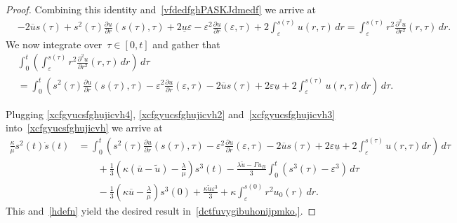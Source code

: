 \documentclass[12pt,a4paper,intlimits,sumlimits]{amsart}
\theoremstyle{definition}
\theoremstyle{plain}
\numberwithin{equation}{section}
\begin{document}
\begin{proof}
Combining this identity and~\eqref{vfdedfghPASKJdmedf} we arrive at
\begin{equation*}
\begin{split}
&-2\overline u s(\tau)+s^2(\tau) \frac{\partial u}{\partial r}(s(\tau),\tau)
+2\underline u\varepsilon -\varepsilon^2 \frac{\partial u}{\partial r}(\varepsilon,\tau)+ 2\int_\varepsilon^{s(\tau)}u(r,\tau)\,dr=\int_\varepsilon^{s(\tau)}r^2 \frac{\partial^2u}{\partial r^2}(r,\tau)\,dr.
\end{split}\end{equation*}
We now integrate over~$\tau\in[0,t]$ and gather that
\begin{equation}\label{xcfgyucsfghujicvh3}
\begin{aligned}&
\int_0^t\left(\int_\varepsilon^{s(\tau)}r^2\frac{\partial^2u}{\partial r^2}(r,\tau)\, dr\right)\,d\tau \\
&=\int_0^t\left(s^2(\tau)\frac{\partial u}{\partial r}(s(\tau),\tau)-\varepsilon^2\frac{\partial u}{\partial r}(\varepsilon,\tau)-2\overline{u} s(\tau)+2\varepsilon\underline{u}+2\int_\varepsilon^{s(\tau)}u(r,\tau)dr\right) \,d\tau.
\end{aligned}
\end{equation}

Plugging \eqref{xcfgyucsfghujicvh4},
\eqref{xcfgyucsfghujicvh2} and~\eqref{xcfgyucsfghujicvh3} into~\eqref{xcfgyucsfghujicvh} we arrive 
at
\begin{equation*}
\begin{aligned}
\frac{\kappa}{\mu}s^2(t)\dot s(t)&=\int_0^t\left(s^2(\tau)\frac{\partial u}{\partial r}(s(\tau),\tau)-\varepsilon^2\frac{\partial u}{\partial r}(\varepsilon,\tau)-2\overline{u}s(\tau)+2\varepsilon \underline{u} +2\int_\varepsilon^{s(\tau)}u(r,\tau)dr\right) \,d\tau \\
&\qquad +\frac{1}{3}\left(\kappa(\overline{u}-\widetilde u)-\frac{\lambda}{\mu}\right)s^3(t)-\frac{\lambda\widetilde u-\Gamma u_B}{3} \int_0^t (s^3(\tau)-\varepsilon^3)\,d\tau\\&\qquad-
\frac{1}{3}\left(\kappa \overline{u}-\frac{\lambda}{\mu}\right)s^3(0)+\frac{\kappa \widetilde u \varepsilon^3}{3}+\kappa\int_\varepsilon^{s(0)}r^2u_0(r)\,dr.
\end{aligned}
\end{equation*}
This and~\eqref{hdefn} yield the desired result in~\eqref{dctfuvygibuhonijpmko,}.
\end{proof}
\end{document}
